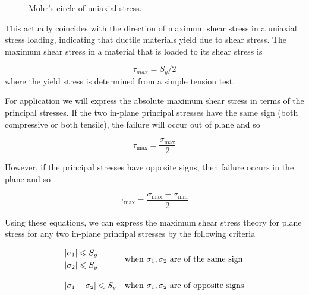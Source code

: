 \documentclass[
10pt,
a4paper,
openany,
svgnames,
]{book}
\begin{document}
\begin{figure}[h]
  \centering 
  \caption{Mohr's circle of uniaxial stress.}
  \label{fig: mohr's circle uniaxial for MSST}
\end{figure}

This actually coincides with the direction of maximum shear stress in a uniaxial stress loading, indicating that ductile materials yield due to shear stress. The maximum shear stress in a material that is loaded to its shear stress is

\begin{equation}
  \label{eq: MSST max shear to yield}
  \tau_{max} = S_y / 2
\end{equation}
where the yield stress is determined from a simple tension test.

For application we will express the absolute maximum shear stress in terms of the principal stresses. If the two in-plane principal stresses have the same sign (both compressive or both tensile), the failure will occur out of plane and so

\begin{equation}
  \tau _{\max } = \frac{\sigma _{\max }}{2}
\end{equation}

However, if the principal stresses have opposite signs, then failure occurs in the plane and so

\begin{equation}
  \tau _{\max } = \frac{\sigma_{\max } - \sigma _{\min }}{2}
\end{equation}

Using these equations, we can express the maximum shear stress theory for plane stress for any two in-plane principal stresses by the following criteria

\begin{equation}
  \begin{array}{ll}
    \begin{gathered}
      \left| \sigma_1 \right| \leqslant S_y \hfill \\
      \left| \sigma_2 \right| \leqslant S_y \hfill \\ 
    \end{gathered}  &\text{when } \sigma _1, \sigma _2 \text{ are of the same sign}  \\[20pt]
    \left| \sigma _1 - \sigma _2 \right| \leqslant S_y &\text{when } \sigma _1, \sigma _2 \text{ are of opposite signs}
  \end{array}
\end{equation}
\end{document}
